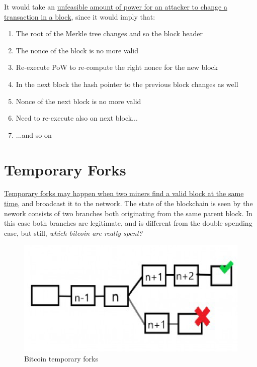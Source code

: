It would take an \ul{unfeasible amount of power for an attacker to change a transaction in a block}, since it would imply that: 
\begin{enumerate}
   \item The root of the Merkle tree changes and so the block header
   \item The nonce of the block is no more valid
   \item Re-execute PoW to re-compute the right nonce for the new block
   \item In the next block the hash pointer to the previous block changes as well
   \item Nonce of the next block is no more valid
   \item Need to re-execute also on next block...
   \item ...and so on
\end{enumerate}

\section{Temporary Forks}

\begin{paracol}{2}
   
   \colfill
   \ul{Temporary forks may happen when two miners find a valid block at the same time}, and broadcast it to the network.
   The state of the blockchain is seen by the nework consists of two branches both
   originating from the same parent block.
   In this case both branches are legitimate, and is different from the double spending case, but still, \textit{which bitcoin are really spent?}
   \colfill

   \switchcolumn

   \colfill
   \begin{figure}[htbp]
      \centering
      \includegraphics{images/bitcoin_forks.png}
      \caption{Bitcoin temporary forks}
      \label{fig:bitcoin_forks}
   \end{figure}
   \colfill
\end{paracol}
   

